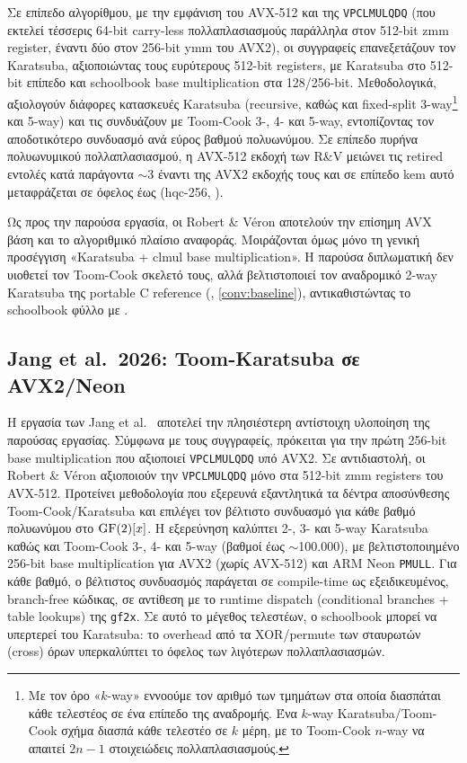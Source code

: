 Σε επίπεδο αλγορίθμου, με την εμφάνιση του AVX-512 και της 
\texttt{VPCLMULQDQ} (που εκτελεί τέσσερις 64-bit carry-less 
πολλαπλασιασμούς παράλληλα στον 512-bit zmm register, έναντι 
δύο στον 256-bit ymm του AVX2), οι συγγραφείς 
επανεξετάζουν τον Karatsuba, αξιοποιώντας τους ευρύτερους 512-bit 
registers, με Karatsuba στο 512-bit επίπεδο και schoolbook base 
multiplication στα 128/256-bit. Μεθοδολογικά, αξιολογούν 
διάφορες κατασκευές Karatsuba (recursive, καθώς και fixed-split 
3-way\footnote{Με τον όρο «$k$-way» εννοούμε τον αριθμό των τμημάτων 
στα οποία διασπάται κάθε τελεστέος σε ένα επίπεδο της αναδρομής. Ένα 
$k$-way Karatsuba/Toom-Cook σχήμα διασπά κάθε τελεστέο σε $k$ μέρη, 
με το Toom-Cook $n$-way να απαιτεί $2n-1$ στοιχειώδεις πολλαπλασιασμούς.} 
και 5-way) και τις συνδυάζουν με Toom-Cook 3-, 4- και 5-way, 
εντοπίζοντας τον αποδοτικότερο συνδυασμό ανά εύρος βαθμού πολυωνύμου. 
Σε επίπεδο πυρήνα πολυωνυμικού πολλαπλασιασμού, η AVX-512 εκδοχή των 
R\&V μειώνει τις retired εντολές κατά παράγοντα $\sim$3 έναντι της AVX2 
εκδοχής τους και σε επίπεδο \gls{kem} αυτό μεταφράζεται σε όφελος έως 
 (hqc-256, \KeyGen).

Ως προς την παρούσα εργασία, οι Robert \& Véron αποτελούν την επίσημη 
AVX βάση και το αλγοριθμικό πλαίσιο αναφοράς. Μοιράζονται όμως μόνο 
τη γενική προσέγγιση «Karatsuba + clmul base multiplication». Η 
παρούσα διπλωματική δεν υιοθετεί τον Toom-Cook σκελετό τους, αλλά βελτιστοποιεί 
τον αναδρομικό 2-way Karatsuba της portable C reference 
(, \cref{conv:baseline}), αντικαθιστώντας το 
schoolbook φύλλο με \vclmul. 

\subsection{Jang et al.\ 2026: Toom-Karatsuba σε AVX2/Neon}
\label{ssec:rw-jang-simd}

Η εργασία των Jang et al.~\cite{Jang2026-gf2x-SIMD} αποτελεί την 
πλησιέστερη αντίστοιχη υλοποίηση της παρούσας εργασίας. Σύμφωνα με 
τους συγγραφείς, πρόκειται για την πρώτη 256-bit base multiplication 
που αξιοποιεί \texttt{VPCLMULQDQ} υπό AVX2. Σε αντιδιαστολή, οι 
Robert \& Véron αξιοποιούν την 
\texttt{VPCLMULQDQ} μόνο στα 512-bit zmm registers του AVX-512. 
Προτείνει μεθοδολογία που εξερευνά εξαντλητικά τα δέντρα αποσύνθεσης 
Toom-Cook/Karatsuba και επιλέγει τον βέλτιστο συνδυασμό για κάθε βαθμό 
πολυωνύμου στο $\mathrm{GF}(2)[x]$. Η εξερεύνηση καλύπτει 2-, 3- και 5-way 
Karatsuba καθώς και Toom-Cook 3-, 4- και 5-way (βαθμοί έως $\sim$100.000), 
με βελτιστοποιημένο 256-bit base multiplication για AVX2 (χωρίς AVX-512) 
και ARM Neon \texttt{PMULL}. Για κάθε βαθμό, ο βέλτιστος συνδυασμός 
παράγεται σε compile-time ως εξειδικευμένος, branch-free κώδικας, σε 
αντίθεση με το runtime dispatch (conditional branches + table lookups) 
της \texttt{gf2x}. Σε αυτό το μέγεθος τελεστέων, ο schoolbook μπορεί 
να υπερτερεί του Karatsuba: το overhead από τα XOR/permute των σταυρωτών 
(cross) όρων υπερκαλύπτει το όφελος των λιγότερων πολλαπλασιασμών.

